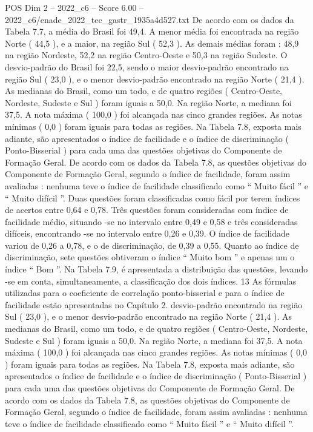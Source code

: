 \begin{textsample}{POS Dim 2 – 2022\_c6 – Score 6.00 – 2022\_c6/enade\_2022\_tec\_gastr\_1935a4d527.txt}
De acordo com os dados da Tabela 7.7, a média do Brasil foi 49,4.
A menor média foi encontrada na região Norte ( 44,5 ), e a maior, na região Sul ( 52,3 ).
As demais médias foram : 48,9 na região Nordeste, 52,2 na região Centro-Oeste e 50,3 na região Sudeste.
O desvio-padrão do Brasil foi 22,5, sendo o maior desvio-padrão encontrado na região Sul ( 23,0 ), e o menor desvio-padrão encontrado na região Norte ( 21,4 ).
As medianas do Brasil, como um todo, e de quatro regiões ( Centro-Oeste, Nordeste, Sudeste e Sul ) foram iguais a 50,0.
Na região Norte, a mediana foi 37,5.
A nota máxima ( 100,0 ) foi alcançada nas cinco grandes regiões.
As notas mínimas ( 0,0 ) foram iguais para todas as regiões.
Na Tabela 7.8, exposta mais adiante, são apresentados o índice de facilidade e o índice de discriminação ( Ponto-Bisserial ) para cada uma das questões objetivas do Componente de Formação Geral.
De acordo com os dados da Tabela 7.8, as questões objetivas do Componente de Formação Geral, segundo o índice de facilidade, foram assim avaliadas : nenhuma teve o índice de facilidade classificado como “ Muito fácil ” e “ Muito difícil ”.
Duas questões foram classificadas como fácil por terem índices de acertos entre 0,64 e 0,78.
Três questões foram consideradas com índice de facilidade médio, situando -se no intervalo entre 0,49 e 0,58 e três consideradas difíceis, encontrando -se no intervalo entre 0,26 e 0,39.
O índice de facilidade variou de 0,26 a 0,78, e o de discriminação, de 0,39 a 0,55.
Quanto ao índice de discriminação, sete questões obtiveram o índice “ Muito bom ” e apenas um o índice “ Bom ”.
Na Tabela 7.9, é apresentada a distribuição das questões, levando -se em conta, simultaneamente, a classificação dos dois índices. 13 As fórmulas utilizadas para o coeficiente de correlação ponto-bisserial e para o índice de facilidade estão apresentadas no Capítulo 2. desvio-padrão encontrado na região Sul ( 23,0 ), e o menor desvio-padrão encontrado na região Norte ( 21,4 ).
As medianas do Brasil, como um todo, e de quatro regiões ( Centro-Oeste, Nordeste, Sudeste e Sul ) foram iguais a 50,0.
Na região Norte, a mediana foi 37,5.
A nota máxima ( 100,0 ) foi alcançada nas cinco grandes regiões.
As notas mínimas ( 0,0 ) foram iguais para todas as regiões.
Na Tabela 7.8, exposta mais adiante, são apresentados o índice de facilidade e o índice de discriminação ( Ponto-Bisserial ) para cada uma das questões objetivas do Componente de Formação Geral.
De acordo com os dados da Tabela 7.8, as questões objetivas do Componente de Formação Geral, segundo o índice de facilidade, foram assim avaliadas : nenhuma teve o índice de facilidade classificado como “ Muito fácil ” e “ Muito difícil ”.

\end{textsample}
